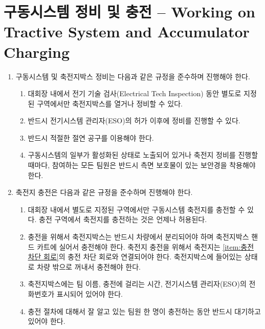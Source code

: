 \documentclass[final,a4paper,10pt]{report}
\begin{document}
\section{구동시스템 정비 및 충전 – Working on Tractive System and Accumulator Charging}\label{rule:formula-technical.ts-maintenance-charging}
\begin{enumerate}
  \item\label{rule:formula-technical.ts-maintenance-charging.maintenance-procedure} 구동시스템 및 축전지박스 정비는 다음과 같은 규정을 준수하며 진행해야 한다.
    \begin{enumerate}
      \item\label{rule:formula-technical.ts-maintenance-charging.maintenance-procedure.designated-area-only} 대회장 내에서 전기 기술 검사(Electrical Tech Inspection) 동안 별도로 지정된 구역에서만 축전지박스를 열거나 정비할 수 있다.
      \item\label{rule:formula-technical.ts-maintenance-charging.maintenance-procedure.eso-approval-required} 반드시 전기시스템 관리자(ESO)의 허가 이후에 정비를 진행할 수 있다.
      \item\label{rule:formula-technical.ts-maintenance-charging.maintenance-procedure.insulated-tools-required} 반드시 적절한 절연 공구를 이용해야 한다.
      \item\label{rule:formula-technical.ts-maintenance-charging.maintenance-procedure.side-shield-safety-glasses} 구동시스템의 일부가 활성화된 상태로 노출되어 있거나 축전지 정비를 진행할 때마다, 참여하는 모든 팀원은 반드시 측면 보호물이 있는 보안경을 착용해야 한다.
    \end{enumerate}

  \item\label{rule:formula-technical.ts-maintenance-charging.charging-procedure} 축전지 충전은 다음과 같은 규정을 준수하며 진행해야 한다.
    \begin{enumerate}
      \item\label{rule:formula-technical.ts-maintenance-charging.charging-procedure.designated-charging-zone} 대회장 내에서 별도로 지정된 구역에서만 구동시스템 축전지를 충전할 수 있다. 충전 구역에서 축전지를 충전하는 것은 언제나 허용된다.
      \item\label{rule:formula-technical.ts-maintenance-charging.charging-procedure.off-board-cart-charging} 충전을 위해서 축전지박스는 반드시 차량에서 분리되어야 하며 축전지박스 핸드 카트에 실어서 충전해야 한다. 축전지 충전을 위해서 축전지는 \ref{item:충전 차단 회로}의 충전 차단 회로와 연결되어야 한다. 축전지박스에 들어있는 상태로 차량 밖으로 꺼내서 충전해야 한다.
      \item\label{rule:formula-technical.ts-maintenance-charging.charging-procedure.charging-info-label} 축전지박스에는 팀 이름, 충전에 걸리는 시간, 전기시스템 관리자(ESO)의 전화번호가 표시되어 있어야 한다.
      \item\label{rule:formula-technical.ts-maintenance-charging.charging-procedure.attendant-required-during-charging} 충전 절차에 대해서 잘 알고 있는 팀원 한 명이 충전하는 동안 반드시 대기하고 있어야 한다.
    \end{enumerate}


\end{enumerate}
\end{document}

